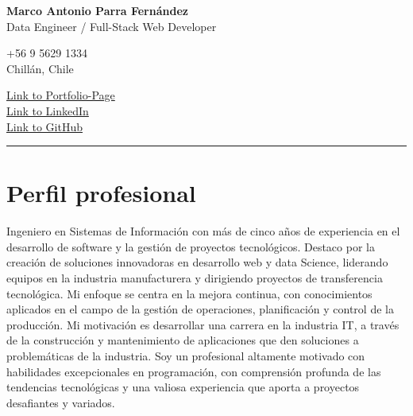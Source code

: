 \documentclass[a4paper,10pt]{article}
\newcommand{\mediumfont}{\fontsize{12pt}{14pt}\selectfont}
\begin{document}
	
	\pagestyle{empty}
	
	\begin{center}
				\textbf{\LARGE Marco Antonio Parra Fernández} \\
			    {\mediumfont Data Engineer / Full-Stack Web Developer} \\

				\begin{minipage}[t]{0.45\textwidth}
					\small +56 9 5629 1334 \\
					\small Chillán, Chile \\
				\end{minipage}%
				\hfill
				\begin{minipage}[t]{0.45\textwidth}
					\raggedleft
        			\small \href{https://portfolio-mparraf.herokuapp.com}{Link to Portfolio-Page} \\
					\small \href{https://www.linkedin.com/in/marco-antonio-parra-82999337/}{Link to LinkedIn} \\
					\small \href{https://www.github.com/maaferna}{Link to GitHub}
				\end{minipage}
				\vspace{10pt} %
				\hrule
				\vspace{10pt} %

	\end{center}
	
	\section*{Perfil profesional}
	\small
	Ingeniero en Sistemas de Información con más de cinco años de experiencia en el desarrollo de software y la gestión de proyectos
	tecnológicos. Destaco por la creación de soluciones innovadoras en desarrollo web y data Science, liderando equipos en la
	industria manufacturera y dirigiendo proyectos de transferencia tecnológica. Mi enfoque se centra en la mejora continua, con
	conocimientos aplicados en el campo de la gestión de operaciones, planificación y control de la producción. Mi motivación
	es desarrollar una carrera en la industria IT, a través de la construcción y mantenimiento de aplicaciones que den soluciones a problemáticas de la industria. Soy un profesional altamente motivado con habilidades excepcionales en programación, con comprensión profunda de las tendencias tecnológicas y una valiosa experiencia que aporta a proyectos desafiantes y variados.
	
\end{document}
